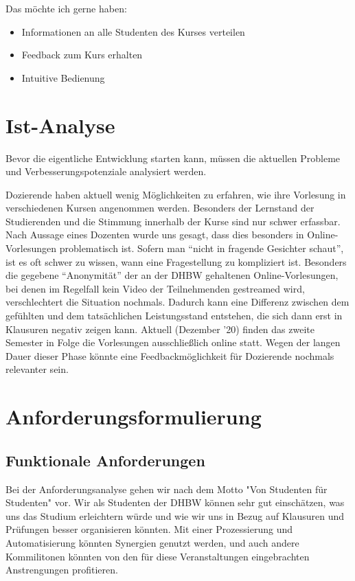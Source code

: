 Das möchte ich gerne haben:
\begin{itemize}
	\item Informationen an alle Studenten des Kurses verteilen
	\item Feedback zum Kurs erhalten
	\item Intuitive Bedienung
\end{itemize}



















\section{Ist-Analyse}
Bevor die eigentliche Entwicklung starten kann, müssen die aktuellen Probleme und Verbesserungspotenziale analysiert werden.

Dozierende haben aktuell wenig Möglichkeiten zu erfahren, wie ihre Vorlesung in verschiedenen Kursen angenommen werden.
Besonders der Lernstand der Studierenden und die Stimmung innerhalb der Kurse sind nur schwer erfassbar.
Nach Aussage eines Dozenten wurde uns gesagt, dass dies besonders in Online-Vorlesungen problematisch ist.
Sofern man \enquote{nicht in fragende Gesichter schaut}, ist es oft schwer zu wissen, wann eine Fragestellung zu kompliziert ist.
Besonders die gegebene \enquote{Anonymität} der an der DHBW gehaltenen Online-Vorlesungen, bei denen im Regelfall kein Video der Teilnehmenden gestreamed wird, verschlechtert die Situation nochmals.
Dadurch kann eine Differenz zwischen dem gefühlten und dem tatsächlichen Leistungsstand entstehen, die sich dann erst in Klausuren negativ zeigen kann.
Aktuell (Dezember '20) finden das zweite Semester in Folge die Vorlesungen ausschließlich online statt. Wegen  der langen Dauer dieser Phase könnte eine Feedbackmöglichkeit für Dozierende nochmals relevanter sein.




\section{Anforderungsformulierung}

\subsection{Funktionale Anforderungen} 
Bei der Anforderungsanalyse gehen wir nach dem Motto "Von Studenten für Studenten" vor. Wir als Studenten der DHBW können sehr gut einschätzen, was uns das Studium erleichtern würde und wie wir uns in Bezug auf Klausuren und Prüfungen besser organisieren könnten. Mit einer Prozessierung und Automatisierung könnten Synergien genutzt werden, und auch andere Kommilitonen könnten von den für diese Veranstaltungen eingebrachten Anstrengungen profitieren.


